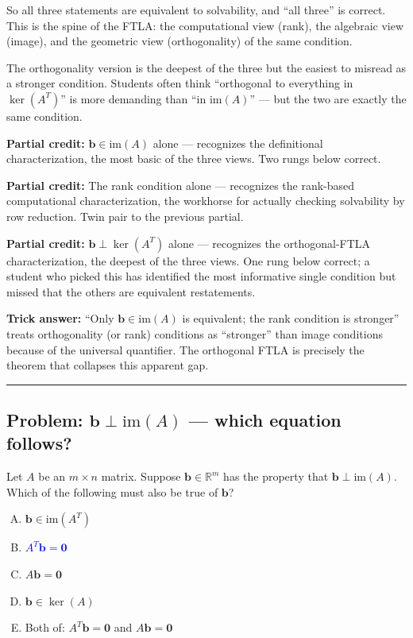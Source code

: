 \documentclass[12pt]{amsart}
\newcommand{\divider}{
  \vspace{-1em}
  \noindent
  \raisebox{-0.15ex}{\textbullet}%
  \hspace{0.5em}%
  \rule[0.5ex]{0.95\textwidth}{1.0pt}%
  \hspace{0.5em}%
  \raisebox{-0.15ex}{\textbullet}%
  \vspace{0em}
}
\begin{document}
So all three statements are equivalent to solvability, and ``all three''
is correct. This is the spine of the FTLA: the computational view
(rank), the algebraic view (image), and the geometric view (orthogonality)
of the same condition.

The orthogonality version is the deepest of the three but the easiest to
misread as a stronger condition. Students often think ``orthogonal to
everything in $\ker(A^T)$'' is more demanding than ``in $\mathrm{im}(A)$''
--- but the two are exactly the same condition.

\textbf{Partial credit:}
$\mathbf{b} \in \mathrm{im}(A)$ alone --- recognizes the definitional
characterization, the most basic of the three views. Two rungs below
correct.

\textbf{Partial credit:}
The rank condition alone --- recognizes the rank-based computational
characterization, the workhorse for actually checking solvability by row
reduction. Twin pair to the previous partial.

\textbf{Partial credit:}
$\mathbf{b} \perp \ker(A^T)$ alone --- recognizes the orthogonal-FTLA
characterization, the deepest of the three views. One rung below correct;
a student who picked this has identified the most informative single
condition but missed that the others are equivalent restatements.

\textbf{Trick answer:}
``Only $\mathbf{b} \in \mathrm{im}(A)$ is equivalent; the rank condition is
stronger'' treats orthogonality (or rank) conditions as ``stronger'' than
image conditions because of the universal quantifier. The orthogonal FTLA
is precisely the theorem that collapses this apparent gap.

\divider

\subsection*{Problem: $\mathbf{b} \perp \mathrm{im}(A)$ --- which equation follows?}

Let $A$ be an $m \times n$ matrix. Suppose $\mathbf{b} \in \mathbb{R}^m$ has
the property that $\mathbf{b} \perp \mathrm{im}(A)$. Which of the following
must also be true of $\mathbf{b}$?

\begin{enumerate}[(A)]
\item $\mathbf{b} \in \mathrm{im}(A^T)$
\item \textcolor{blue}{\textbf{$A^T \mathbf{b} = \mathbf{0}$}}
\item $A \mathbf{b} = \mathbf{0}$
\item $\mathbf{b} \in \ker(A)$
\item Both of: $A^T \mathbf{b} = \mathbf{0}$ and $A\mathbf{b} = \mathbf{0}$
\end{enumerate}
\end{document}
